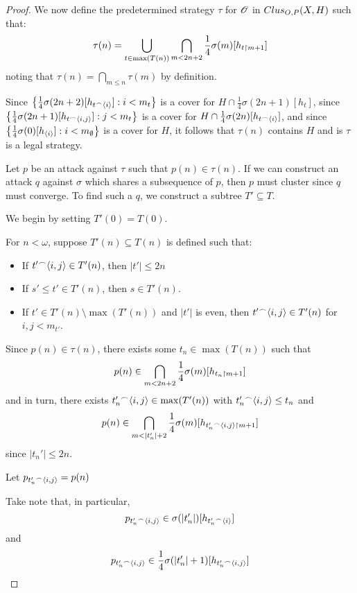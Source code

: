 \begin{proof}
  \bigskip

  We now define the predetermined strategy $\tau$ for $\mathscr{O}$ in 
  $Clus_{O,P}(X,H)$ such that:
  \[
    \tau(n) 
      = 
    \bigcup_{t\in\max(T(n))} 
      \bigcap_{m<2n+2}
        \frac{1}{4}\sigma(m)[h_{t\restriction m+1}]
  \]
  noting that $\tau(n)=\bigcap_{m\leq n}\tau(m)$ by definition.

  Since 
  $\left\{\frac{1}{4}\sigma(2n+2)[h_{t{^\frown}\langle i\rangle}]:i<m_{t}\right\}$ is a cover
  for $H\cap \frac{1}{4}\sigma(2n+1)[h_{t}]$, since \\
  $\left\{\frac{1}{4}\sigma(2n+1)[h_{t{^\frown}\langle i,j\rangle}]:j<m_{t}\right\}$ is 
  a cover for $H\cap \frac{1}{4}\sigma(2n)[h_{t{^\frown}\langle i\rangle}]$, and since
  $\left\{\frac{1}{4}\sigma(0)[h_{\langle i\rangle}]:i<m_{\emptyset}\right\}$ is a 
  cover for $H$, it follows that $\tau(n)$ contains $H$ and is $\tau$ is
  a legal strategy.


  Let $p$ be an attack against $\tau$ such that 
  $p(n)\in \tau(n)$. If we can construct an attack $q$ 
  against $\sigma$ which shares a subsequence of $p$, then $p$ must cluster
  since $q$ must converge.
  To find such a $q$, we construct a subtree $T'\subseteq T$.

  We begin by setting $T'(0)=T(0)$.

  For $n<\omega$, suppose $T'(n)\subseteq T(n)$ is defined such that:
    \begin{itemize}
      \item If $t'{^\frown}\langle i,j\rangle\in T'(n)$, then $|t'|\leq 2n$
      \item If $s'\leq t'\in T'(n)$, then $s\in T'(n)$.
      \item If $t'\in T'(n)\setminus\max(T'(n))$ and $|t'|$ is even,
            then $t'{^\frown}\langle i,j\rangle\in T'(n)$ for $i,j<m_{t'}$.
    \end{itemize}

  Since $p(n)\in\tau(n)$, there exists some $t_n\in\max(T(n))$ such that
  \[
    p(n) 
      \in
    \bigcap_{m<2n+2}
    \frac{1}{4}\sigma(m)[h_{t_n\restriction m+1}]
  \]
  and in turn, there exists $t_n'{^\frown}\langle i,j\rangle\in\max(T'(n))$ 
  with $t_n'{^\frown}\langle i,j\rangle\leq t_n$ and
  \[
    p(n)
      \in
    \bigcap_{m<|t_n'|+2}
    \frac{1}{4}\sigma(m)[h_{t_n'\concat\<i,j\>\rest m+1}]
  \]
  since $|t_n'|\leq 2n$.

  Let $p_{t_n'{^\frown}\langle i,j\rangle}=p(n)$

  Take note that, in particular,
  \[
    p_{t_n'{^\frown}\langle i,j\rangle}
      \in
    \sigma(|t_n'|)[h_{t_n'{^\frown}\langle i\rangle}]
  \]
  and
  \[
    p_{t_n'{^\frown}\langle i,j\rangle}
      \in
    \frac{1}{4}\sigma(|t_n'|+1)[h_{t_n'{^\frown}\langle i,j\rangle}]
  \]


\end{proof}
